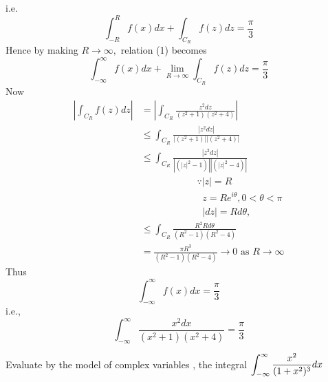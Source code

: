 \begin{solution}
i.e. \[\int_{-R}^{R}f(x)dx+\int_{C_{R}}f(z)dz=\frac{\pi}{3}\]
Hence by making $R\rightarrow\infty,$ relation (1) becomes 
\[\int_{-\infty}^{\infty}f(x)dx+\lim_{R\rightarrow\infty}\int_{C_{R}}f(z)dz=\frac{\pi}{3}\]
Now
\begin{align*}
\left|\int_{C_{R}}f(z)dz\right| & =\left|\int_{C_{R}}\frac{z^{2}dz}{(z^{2}+1)(z^{2}+4)}\right|\\
 & \leq\int_{C_{R}}\frac{\left|z^{2}dz\right|}{\left|(z^{2}+1)\right|\left|(z^{2}+4)\right|}\\
 & \leq\int_{C_{R}}\frac{\left|z^{2}dz\right|}{\left|(|z|^{2}-1)\right|\left|(|z|^{2}-4)\right|}\\
 & \;\;\;\;\;\;\;\;\;\;\;\;\;\;\;\;\;\;\;\;\;\because|z|=R\\
 & \;\;\;\;\;\;\;\;\;\;\;\;\;\;\;\;\;\;\;\;\;\;\; z=Re^{i\theta},0<\theta<\pi\\
 & \;\;\;\;\;\;\;\;\;\;\;\;\;\;\;\;\;\;\;\;\;\;\;|dz|=Rd\theta,\\
 & \leq\int_{C_{R}}\frac{R^{2}Rd\theta}{(R^{2}-1)(R^{2}-4)}\\
 & =\frac{\pi R^{3}}{(R^{2}-1)(R^{2}-4)}\rightarrow0\text{ as }R\rightarrow\infty\end{align*}
Thus
\[\int_{-\infty}^{\infty}f(x)dx=\frac{\pi}{3}\]
i.e.,\[\int_{-\infty}^{\infty}\frac{x^{2}dx}{(x^{2}+1)(x^{2}+4)}=\frac{\pi}{3}\]
\end{solution}
\begin{example}
Evaluate by the model of complex variables , the integral $\displaystyle \int_{-\infty}^{\infty}\frac{x^{2}}{(1+x^{2})^{3}}dx$
\end{example}
